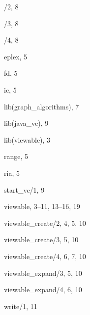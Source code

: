 %
% 
% 
% 
% 
\begin{theindex}

  \item /2, 8
  \item /3, 8
  \item /4, 8

  \indexspace

  \item eplex, 5

  \indexspace

  \item fd, 5

  \indexspace

  \item ic, 5

  \indexspace

  \item lib(graph\_algorithms), 7
  \item lib(java\_vc), 9
  \item lib(viewable), 3

  \indexspace

  \item range, 5
  \item ria, 5

  \indexspace

  \item start\_vc/1, 9

  \indexspace

  \item viewable, 3--11, 13--16, 19
  \item viewable\_create/2, 4, 5, 10
  \item viewable\_create/3, 5, 10
  \item viewable\_create/4, 6, 7, 10
  \item viewable\_expand/3, 5, 10
  \item viewable\_expand/4, 6, 10

  \indexspace

  \item write/1, 11

\end{theindex}
